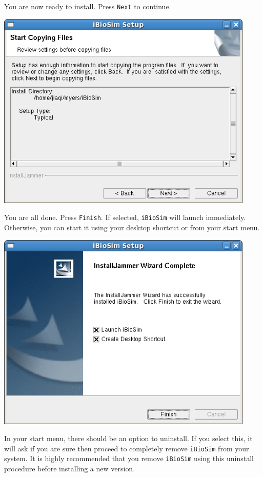 \documentclass[titlepage,11pt]{article}
\begin{document}
You are now ready to install.  Press {\tt Next} to continue.

\includegraphics[height=95mm]{screenshots/confirm}

\clearpage

You are all done.  Press {\tt Finish}.  If selected, {\tt iBioSim}
will launch immediately.  Otherwise, you can start it using your
desktop shortcut or from your start menu.

\includegraphics[height=95mm]{screenshots/finish}

In your start menu, there should be an option to uninstall.  If you
select this, it will ask if you are sure then proceed to completely
remove {\tt iBioSim} from your system.  It is highly recommended that
you remove {\tt iBioSim} using this uninstall procedure before
installing a new version.
\end{document}
